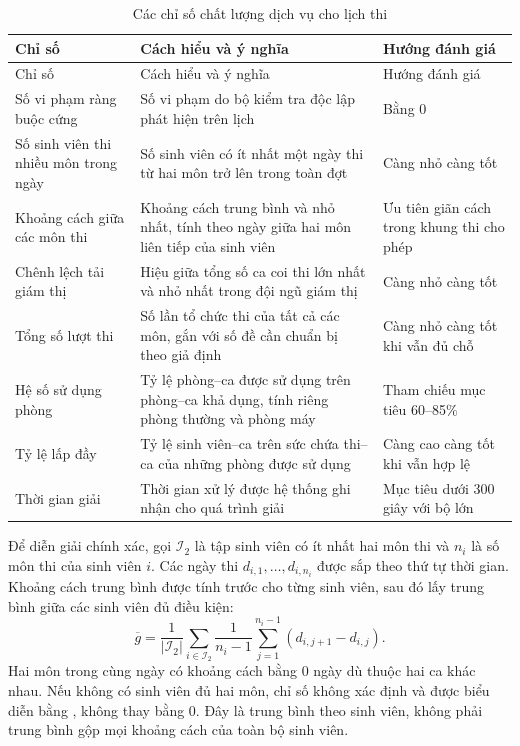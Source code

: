 \begin{longtable}{@{}p{}p{}p{}@{}}
    \caption{Các chỉ số chất lượng dịch vụ cho lịch thi}\label{tab:kpi-lich-thi} \\
    \toprule
    Chỉ số & Cách hiểu và ý nghĩa & Hướng đánh giá \\
    \midrule
    \endfirsthead
    \toprule
    Chỉ số & Cách hiểu và ý nghĩa & Hướng đánh giá \\
    \midrule
    \endhead
    \bottomrule
    \endfoot
    Số vi phạm ràng buộc cứng & Số vi phạm do bộ kiểm tra độc lập phát hiện trên lịch & Bằng 0 \\
    \addlinespace
    Số sinh viên thi nhiều môn trong ngày & Số sinh viên có ít nhất một ngày thi từ hai môn trở lên trong toàn đợt & Càng nhỏ càng tốt \\
    \addlinespace
    Khoảng cách giữa các môn thi & Khoảng cách trung bình và nhỏ nhất, tính theo ngày giữa hai môn liên tiếp của sinh viên & Ưu tiên giãn cách trong khung thi cho phép \\
    \addlinespace
    Chênh lệch tải giám thị & Hiệu giữa tổng số ca coi thi lớn nhất và nhỏ nhất trong đội ngũ giám thị & Càng nhỏ càng tốt \\
    \addlinespace
    Tổng số lượt thi & Số lần tổ chức thi của tất cả các môn, gắn với số đề cần chuẩn bị theo giả định & Càng nhỏ càng tốt khi vẫn đủ chỗ \\
    \addlinespace
    Hệ số sử dụng phòng & Tỷ lệ phòng--ca được sử dụng trên phòng--ca khả dụng, tính riêng phòng thường và phòng máy & Tham chiếu mục tiêu 60--85\% \\
    \addlinespace
    Tỷ lệ lấp đầy & Tỷ lệ sinh viên--ca trên sức chứa thi--ca của những phòng được sử dụng & Càng cao càng tốt khi vẫn hợp lệ \\
    \addlinespace
    Thời gian giải & Thời gian xử lý được hệ thống ghi nhận cho quá trình giải & Mục tiêu dưới 300 giây với bộ lớn \\
\end{longtable}

Để diễn giải chính xác, gọi $\mathcal{I}_2$ là tập sinh viên có ít nhất hai môn thi và $n_i$ là số môn thi của sinh viên $i$. Các ngày thi $d_{i,1},\ldots,d_{i,n_i}$ được sắp theo thứ tự thời gian. Khoảng cách trung bình được tính trước cho từng sinh viên, sau đó lấy trung bình giữa các sinh viên đủ điều kiện:
\begin{equation}
    \overline{g}
    = \frac{1}{|\mathcal{I}_2|}
      \sum_{i\in\mathcal{I}_2}
      \frac{1}{n_i-1}\sum_{j=1}^{n_i-1}
      \left(d_{i,j+1}-d_{i,j}\right).
    \label{eq:kpi-khoang-cach}
\end{equation}
Hai môn trong cùng ngày có khoảng cách bằng 0 ngày dù thuộc hai ca khác nhau. Nếu không có sinh viên đủ hai môn, chỉ số không xác định và được biểu diễn bằng , không thay bằng 0. Đây là trung bình theo sinh viên, không phải trung bình gộp mọi khoảng cách của toàn bộ sinh viên.

